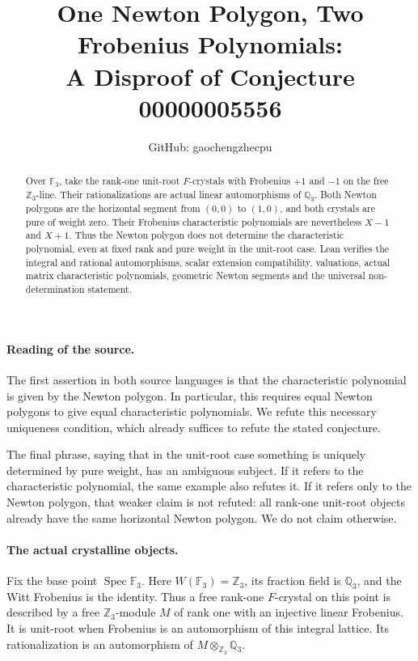 \documentclass[11pt]{article}
\title{One Newton Polygon, Two Frobenius Polynomials:\\A Disproof of Conjecture 00000005556}
\author{GitHub: gaochengzhecpu}
\date{}
\begin{document}
\maketitle
\begin{abstract}
Over $\mathbb F_3$, take the rank-one unit-root $F$-crystals with
Frobenius $+1$ and $-1$ on the free $\mathbb Z_3$-line. Their
rationalizations are actual linear automorphisms of $\mathbb Q_3$.
Both Newton polygons are the horizontal segment from $(0,0)$ to
$(1,0)$, and both crystals are pure of weight zero. Their Frobenius
characteristic polynomials are nevertheless $X-1$ and $X+1$.
Thus the Newton polygon does not determine the characteristic
polynomial, even at fixed rank and pure weight in the unit-root case.
Lean verifies the integral and rational automorphisms, scalar
extension compatibility, valuations, actual matrix characteristic
polynomials, geometric Newton segments and the universal
non-determination statement.
\end{abstract}

\paragraph{Reading of the source.}
The first assertion in both source languages is that the
characteristic polynomial is given by the Newton polygon. In
particular, this requires equal Newton polygons to give equal
characteristic polynomials. We refute this necessary uniqueness
condition, which already suffices to refute the stated conjecture.

The final phrase, saying that in the unit-root case something is
uniquely determined by pure weight, has an ambiguous subject. If
it refers to the characteristic polynomial, the same example also
refutes it. If it refers only to the Newton polygon, that weaker
claim is not refuted: all rank-one unit-root objects already have
the same horizontal Newton polygon. We do not claim otherwise.

\paragraph{The actual crystalline objects.}
Fix the base point $\operatorname{Spec}\mathbb F_3$. Here
$W(\mathbb F_3)=\mathbb Z_3$, its fraction field is
$\mathbb Q_3$, and the Witt Frobenius is the identity. Thus a free
rank-one $F$-crystal on this point is described by a free
$\mathbb Z_3$-module $M$ of rank one with an injective linear
Frobenius. It is unit-root when Frobenius is an automorphism of
this integral lattice. Its rationalization is an automorphism of
$M\otimes_{\mathbb Z_3}\mathbb Q_3$.
\end{document}
